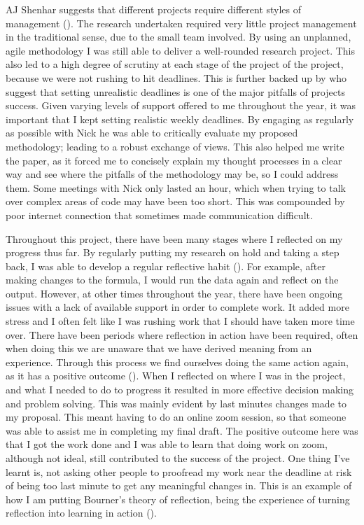 AJ Shenhar suggests that different projects require different styles of management (\cite{Shenhar1}). The research undertaken required very little project management in the traditional sense, due to the small team involved. By using an unplanned, agile methodology I was still able to deliver a well-rounded research project. This also led to a high degree of scrutiny at each stage of the project of the project, because we were not rushing to hit deadlines. This is further backed up by \citeauthor{GanttPRO} who suggest that setting unrealistic deadlines is one of the  major pitfalls of projects success. Given varying levels of support offered to me throughout the year, it was important that I kept setting realistic weekly deadlines. By engaging as regularly as possible with Nick he was able to critically evaluate my proposed methodology; leading to a robust exchange of views. This also helped me write the paper, as it forced me to concisely explain my thought processes in a clear way and see where the pitfalls of the methodology may be, so I could address them. Some meetings with Nick only lasted an hour, which when trying to talk over complex areas of code may have been too short. This was compounded by poor internet connection that sometimes made communication difficult.





Throughout this project, there have been many stages where I reflected on my progress thus far. By regularly putting my research on hold and taking a step back, I was able to develop a regular reflective habit  (\cite{dyment2010quality}). For example, after making changes to the formula, I would run the data again and reflect on the output. However, at other times throughout the year, there have been ongoing issues with a lack of available support in order to complete work. It added more stress and I often felt like I was rushing work that I should have taken more time over. There have been periods where reflection in action have been required, often when doing this we are unaware that we have derived meaning from an experience. Through this process we find ourselves doing the same action again, as it has a positive outcome (\cite{Schon83}). When I reflected on where I was in the project, and what I needed to do to progress it resulted in more effective decision making and problem solving. This was mainly evident by last minutes changes made to my proposal. This meant having to do an online zoom session, so that someone was able to assist me in completing my final draft. The positive outcome here was that I got the work done and I was able to learn that doing work on zoom, although not ideal, still contributed to the success of the project. One thing I've learnt is, not asking other people to proofread my work near the deadline at risk of being too last minute to get any meaningful changes in. This is an example of how I am putting Bourner's theory of reflection, being the experience of turning reflection into learning in action (\cite{bourner2003assessing}).

